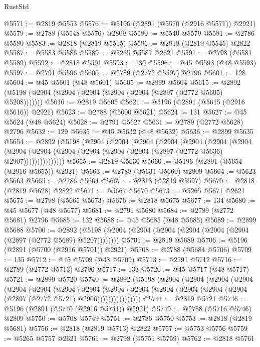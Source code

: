 \begin{lexlean}{RustStd}
\begin{coremodule}
@5571 := @2819 @5553
@5576 := @5196 (@2891 (@5570 (@2916 @5571)) @2921)
@5579 := @2788 (@5548 @5576) @2809
@5580 := @5540 @5579
@5581 := @2786 @5580
@5583 := @2818 (@2819 @5515)
@5586 := @2818 (@2819 @5545) @2822
@5587 := @5583 @5586
@5589 := @5265 @5587 @2621
@5591 := @2798 (@5581 @5589)
@5592 := @2818 @5591
@5593 := 130
@5596 := @45 @5593 (@48 @5593)
@5597 := @2791 @5596
@5600 := @2789 (@2772 @5597) @2796
@5601 := 128
@5604 := @45 @5601 (@48 @5601)
@5605 := @2899 @5604
@5615 := @2892 (@5198 (@2904 (@2904 (@2904 (@2904 (@2904 (@2897 (@2772 @5605) @5208)))))))
@5616 := @2819 @5605
@5621 := @5196 (@2891 (@5615 (@2916 @5616)) @2921)
@5623 := @2788 (@5600 @5621)
@5624 := 131
@5627 := @45 @5624 (@48 @5624)
@5628 := @2791 @5627
@5631 := @2789 (@2772 @5628) @2796
@5632 := 129
@5635 := @45 @5632 (@48 @5632)
@5636 := @2899 @5635
@5654 := @2892
    (@5198
      (@2904
        (@2904
          (@2904
            (@2904
              (@2904
                (@2904
                  (@2904
                    (@2904
                      (@2904 (@2904 (@2904 (@2904 (@2904 (@2897 (@2772 @5636) @2907)))))))))))))))
@5655 := @2819 @5636
@5660 := @5196 (@2891 (@5654 (@2916 @5655)) @2921)
@5663 := @2788 (@5631 @5660) @2809
@5664 := @5623 @5663
@5665 := @2786 @5664
@5667 := @2818 (@2819 @5597)
@5670 := @2818 (@2819 @5628) @2822
@5671 := @5667 @5670
@5673 := @5265 @5671 @2621
@5675 := @2798 (@5665 @5673)
@5676 := @2818 @5675
@5677 := 134
@5680 := @45 @5677 (@48 @5677)
@5681 := @2791 @5680
@5684 := @2789 (@2772 @5681) @2796
@5685 := 132
@5688 := @45 @5685 (@48 @5685)
@5689 := @2899 @5688
@5700 := @2892 (@5198 (@2904 (@2904 (@2904 (@2904 (@2904 (@2904 (@2897 (@2772 @5689) @5207))))))))
@5701 := @2819 @5689
@5706 := @5196 (@2891 (@5700 (@2916 @5701)) @2921)
@5708 := @2788 (@5684 @5706)
@5709 := 135
@5712 := @45 @5709 (@48 @5709)
@5713 := @2791 @5712
@5716 := @2789 (@2772 @5713) @2796
@5717 := 133
@5720 := @45 @5717 (@48 @5717)
@5721 := @2899 @5720
@5740 := @2892
    (@5198
      (@2904
        (@2904
          (@2904
            (@2904
              (@2904
                (@2904
                  (@2904
                    (@2904
                      (@2904
                        (@2904
                          (@2904 (@2904 (@2904 (@2904 (@2897 (@2772 @5721) @2906))))))))))))))))
@5741 := @2819 @5721
@5746 := @5196 (@2891 (@5740 (@2916 @5741)) @2921)
@5749 := @2788 (@5716 @5746) @2809
@5750 := @5708 @5749
@5751 := @2786 @5750
@5753 := @2818 (@2819 @5681)
@5756 := @2818 (@2819 @5713) @2822
@5757 := @5753 @5756
@5759 := @5265 @5757 @2621
@5761 := @2798 (@5751 @5759)
@5762 := @2818 @5761

\end{coremodule}
\end{lexlean}
